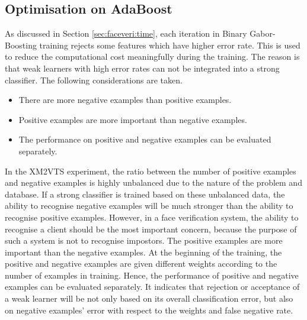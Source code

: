 \subsection{Optimisation on AdaBoost}
As discussed in \mbox{Section} \ref{sec:faceveri:time}, each iteration in Binary Gabor-Boosting training rejects some features which have higher error rate. This is used to reduce the computational cost meaningfully during the training. The reason is that weak learners with high error rates can not be integrated into a strong classifier. The following considerations are taken.
\begin{itemize}
 \item There are more negative examples than positive examples.
 \item Positive examples are more important than negative examples.
 \item The performance on positive and negative examples can be evaluated separately.
\end{itemize}
In the \mbox{XM2VTS} experiment, the ratio between the number of positive examples and negative examples is highly unbalanced due to the nature of the problem and database. If a strong classifier is trained based on these unbalanced data, the ability to recognise negative examples will be much stronger than the ability to recognise positive examples. However, in a face verification system, the ability to recognise a client should be the most important concern, because the purpose of such a system is not to recognise impostors. The positive examples are more important than the negative examples. At the beginning of the training, the positive and negative examples are given different weights according to the number of examples in training. Hence, the performance of positive and negative examples can be evaluated separately. It indicates that rejection or acceptance of a weak learner will be not only based on its overall classification error, but also on negative examples' error with respect to the weights and false negative rate. 

